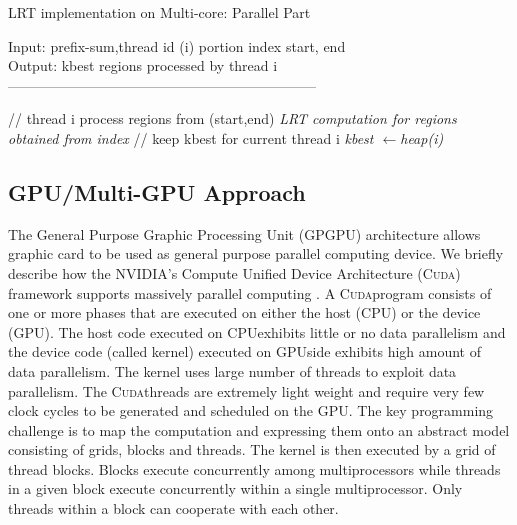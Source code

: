 \documentclass[AMA,LATO1COL]{WileyNJD-v2-bak}
\newcommand{\gpu}{\textsc{GPU}}
\newcommand{\cpu}{\textsc{CPU}}
\newcommand{\cuda}{\textsc{Cuda}}
\begin{document}
\begin{algorithm}[t!]
\caption{LRT implementation on Multi-core: Parallel Part}\label{multicorep}
Input: prefix-sum,thread id (i) portion index start, end\\
Output: kbest regions processed by thread i\\
------------------------------------------------------------------ \\
\begin{algorithmic}[1]
 \State // thread i process regions from (start,end)
\State \textit {LRT computation for regions obtained from index}
\State // keep kbest for current thread i
\State \textit {kbest \(\leftarrow\)heap(i)}
\EndFor
\end{algorithmic}
\end{algorithm}




\subsection{GPU/Multi-GPU Approach}
The General Purpose Graphic Processing Unit (GPGPU) architecture
allows graphic card to be used as general purpose parallel computing
device.  We briefly describe how the NVIDIA's Compute Unified Device Architecture (\cuda) framework supports massively parallel computing \cite{cuda}. A \cuda program consists of one or more phases that are executed on either the host (\cpu) or the device (\gpu). The host code executed on \cpu exhibits little or no data parallelism and the device code (called kernel) executed on \gpu side exhibits high amount of data parallelism. The kernel uses large number of threads to exploit data parallelism. The \cuda threads are
extremely light weight and require very few clock cycles to be generated and scheduled on the \gpu. The key programming challenge is to map the computation and expressing them onto an abstract model consisting of grids, blocks and threads. The kernel is then executed by a grid of thread blocks. Blocks execute concurrently among multiprocessors while threads in a given block execute concurrently within a single multiprocessor. Only threads within a block can cooperate with each other.
\end{document}
